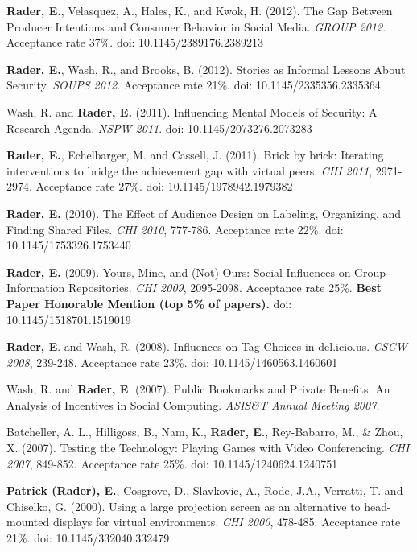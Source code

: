 \documentclass[9pt]{extarticle}
\begin{document}
\textbf{Rader, E.}, Velasquez, A., Hales, K., and Kwok, H. (2012). The Gap Between Producer Intentions and Consumer Behavior in Social Media. \emph{GROUP 2012}. Acceptance rate 37\%. doi: 10.1145/2389176.2389213

\textbf{Rader, E.}, Wash, R., and Brooks, B. (2012). Stories as Informal Lessons About Security. \emph{SOUPS 2012}. Acceptance rate 21\%. doi: 10.1145/2335356.2335364

Wash, R. and \textbf{Rader, E.} (2011). Influencing Mental Models of Security: A Research Agenda. \emph{NSPW 2011}. doi: 10.1145/2073276.2073283

\textbf{Rader, E.}, Echelbarger, M. and Cassell, J. (2011). Brick by brick: Iterating interventions to bridge the achievement gap with virtual peers. \emph{CHI 2011}, 2971-2974. Acceptance rate 27\%. doi: 10.1145/1978942.1979382

\textbf{Rader, E.} (2010). The Effect of Audience Design on Labeling, Organizing, and Finding Shared Files. \emph{CHI 2010}, 777-786. Acceptance rate 22\%. doi: 10.1145/1753326.1753440

\textbf{Rader, E.} (2009). Yours, Mine, and (Not) Ours: Social Influences on Group Information Repositories. \emph{CHI 2009}, 2095-2098. Acceptance rate 25\%. \textbf{Best Paper Honorable Mention (top 5\% of papers).} doi: 10.1145/1518701.1519019

\textbf{Rader, E}. and Wash, R. (2008). Influences on Tag Choices in del.icio.us. \emph{CSCW 2008}, 239-248. Acceptance rate 23\%. doi: 10.1145/1460563.1460601

Wash, R. and \textbf{Rader, E}. (2007). Public Bookmarks and Private Benefits: An Analysis of Incentives in Social Computing. \emph{ASIS\&T Annual Meeting 2007.}

Batcheller, A. L., Hilligoss, B., Nam, K., \textbf{Rader, E.}, Rey-Babarro, M., \& Zhou, X. (2007). Testing the Technology: Playing Games with Video Conferencing. \emph{CHI 2007}, 849-852. Acceptance rate 25\%. doi: 10.1145/1240624.1240751

\textbf{Patrick (Rader), E.}, Cosgrove, D., Slavkovic, A., Rode, J.A., Verratti, T. and Chiselko, G. (2000). Using a large projection screen as an alternative to head-mounted displays for virtual environments. \emph{CHI 2000}, 478-485. Acceptance rate 21\%. doi: 10.1145/332040.332479
\end{document}
